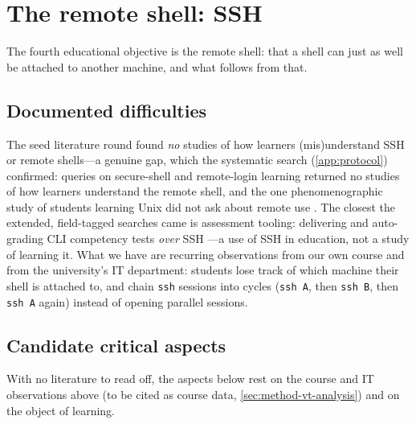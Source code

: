 \mode*
\section{The remote shell: SSH}
\label{sec:ssh}

The fourth educational objective is the remote shell: that a shell can just
as well be attached to another machine, and what follows from that.

\subsection{Documented difficulties}

The seed literature round found \emph{no} studies of how learners
(mis)understand SSH or remote shells---a genuine gap, which the systematic
search (\cref{app:protocol}) confirmed: queries on secure-shell and
remote-login learning returned no studies of how learners understand the
remote shell, and the one phenomenographic study of students learning
Unix did not ask about remote use \autocite{DoyleLister2006Unix}.
The closest the extended, field-tagged searches came is assessment
tooling: delivering and auto-grading CLI competency tests \emph{over}
SSH \autocite{Costa2023SSHAssess}---a use of SSH in education, not a
study of learning it.
What we have are recurring observations from our own course and from the
university's IT department: students lose track of which machine their
shell is attached to, and chain \texttt{ssh} sessions into cycles
(\texttt{ssh A}, then \texttt{ssh B}, then \texttt{ssh A} again) instead
of opening parallel sessions.

\subsection{Candidate critical aspects}
\label{sec:ssh-aspects}

With no literature to read off, the aspects below rest on the course and
IT observations above (to be cited as course data,
\cref{sec:method-vt-analysis}) and on the object of learning.

